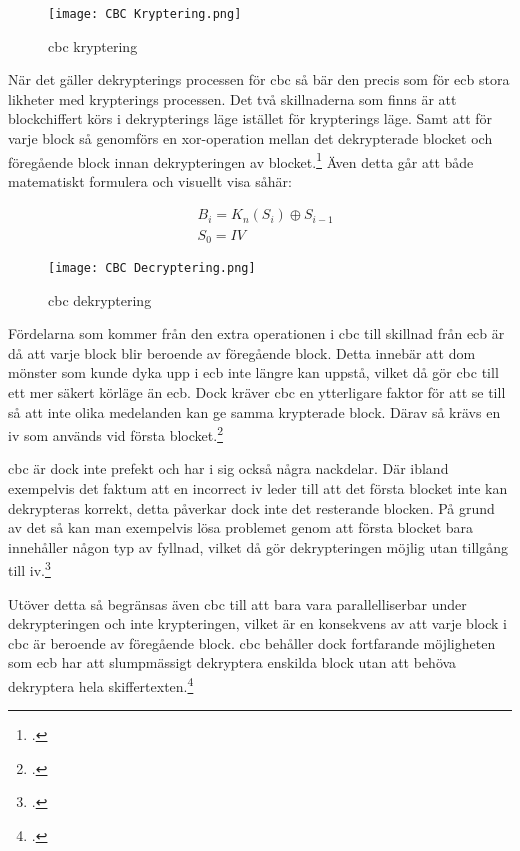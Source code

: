 \begin{figure}[H]
    \texttt{[image: CBC Kryptering.png]}
    \caption{\acrlong{cbc} kryptering}
    \label{fig:cbc-mode-enc}
\end{figure}

När det gäller dekrypterings processen för \acrshort{cbc} så bär den precis som för
\acrshort{ecb} stora likheter med krypterings processen. Det två skillnaderna som
finns är att blockchiffert körs i dekrypterings läge istället för krypterings läge.
Samt att för varje block så genomförs en \gls{xor}-operation mellan det dekrypterade
blocket och föregående block innan dekrypteringen av blocket.\footcite{dworkin2001sp}
Även detta går att både matematiskt formulera och visuellt visa såhär:

\begin{equation}
    \label{eq:cbc-decryption}
    \begin{aligned}
        &B_i = K_n(S_i) \oplus S_{i-1}\\\nonumber
        &S_0 = IV
    \end{aligned}
\end{equation}

\begin{figure}[H]
    \texttt{[image: CBC Decryptering.png]}
    \caption{\acrlong{cbc} dekryptering}
    \label{fig:cbc-mode-dec}
\end{figure}

Fördelarna som kommer från den extra operationen i \acrshort{cbc} till skillnad
från \acrshort{ecb} är då att varje block blir beroende av föregående block.
Detta innebär att dom mönster som kunde dyka upp i \acrshort{ecb} inte längre
kan uppstå, vilket då gör \acrshort{cbc} till ett mer säkert körläge än \acrshort{ecb}.
Dock kräver \acrshort{cbc} en ytterligare faktor för att se till så att inte olika medelanden
kan ge samma krypterade block. Därav så krävs en \acrfull{iv} som används vid första
blocket.\footcite{dworkin2001sp}

\acrshort{cbc} är dock inte prefekt och har i sig också några nackdelar. Där ibland
exempelvis det faktum att en incorrect \acrshort{iv} leder till att det första blocket
inte kan dekrypteras korrekt, detta påverkar dock inte det resterande blocken. På grund
av det så kan man exempelvis lösa problemet genom att första blocket bara innehåller
någon typ av fyllnad, vilket då gör dekrypteringen möjlig utan tillgång till \acrshort{iv}.\footcite{dworkin2001sp}

Utöver detta så begränsas även \acrshort{cbc} till att bara vara parallelliserbar under
dekrypteringen och inte krypteringen, vilket är en konsekvens av att varje block i \acrshort{cbc}
är beroende av föregående block. \acrshort{cbc} behåller dock fortfarande möjligheten
som \acrshort{ecb} har att slumpmässigt dekryptera enskilda block utan att behöva
dekryptera hela skiffertexten.\footcite{dworkin2001sp}

